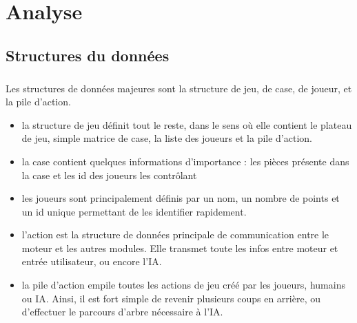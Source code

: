 \documentclass{report}
\begin{document}
\chapter{Analyse}

    \section*{Structures du données}
        \paragraph*{}
        Les structures de données majeures sont la structure de jeu, de case, de joueur, et la pile d'action.
        \begin{itemize} %
            \item la structure de jeu définit tout le reste, dans le sens où elle contient le plateau de jeu, simple matrice de case, la liste des joueurs et la pile d'action.
            \item la case contient quelques informations d'importance : les pièces présente dans la case et les id des joueurs les contrôlant
            \item les joueurs sont principalement définis par un nom, un nombre de points et un id unique permettant de les identifier rapidement.
            \item l'action est la structure de données principale de communication entre le moteur et les autres modules. Elle transmet toute les infos entre moteur et entrée utilisateur,
                ou encore l'IA.
            \item la pile d'action empile toutes les actions de jeu créé par les joueurs, humains ou IA. Ainsi, il est fort simple de revenir plusieurs coups en arrière, 
                ou d'effectuer le parcours d'arbre nécessaire à l'IA.
        \end{itemize}
\end{document}
